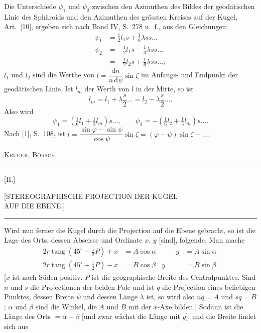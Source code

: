 Die Unterschiede $\psi_1$ und $\psi_2$ zwischen den Azimuthen des Bildes der geodätischen Linie des Sphäroids und den Azimuthen des grössten Kreises auf der Kugel, Art.~[10], ergeben sich nach Band IV, S.~278 u.~f., aus den Gleichungen:
\[
\begin{aligned}
\psi_1&=\tfrac12l_1s+\tfrac16\lambda ss\ldots\\
\psi_2&=-\tfrac12l_1s-\tfrac13\lambda ss\ldots\\
&=-\tfrac12l_2s+\tfrac16\lambda ss\ldots;
\end{aligned}
\]
$l_1$ und $l_2$ sind die Werthe von $l=\dfrac{\mathrm dn}{n\,\mathrm d\psi}\sin\zeta$ im Anfangs- und Endpunkt der geodätischen Linie. Ist $l_m$ der Werth von $l$ in der Mitte, so ist
\[
l_m=l_1+\lambda\frac s2\ldots=l_2-\lambda\frac s2\ldots.
\]
Also wird
\[
\psi_1=(\tfrac16l_1+\tfrac13l_m)s\ldots,\qquad\psi_2=-(\tfrac16l_2+\tfrac13l_m)s\ldots.
\]
Nach [1], S.~108, ist $l=\dfrac{\sin\varphi-\sin\psi}{\cos\psi}\sin\zeta=(\varphi-\psi)\sin\zeta-\ldots.$\par
\noindent\hfill\textsc{Krüger, Börsch.}\par
\par\endgroup
\vfill\begin{center}\rule{.24\textwidth}{.4pt}\end{center}
\clearpage
\begin{center}
[II.]\par\bigskip
{\large [STEREOGRAPHISCHE PROJECTION DER KUGEL\\AUF DIE EBENE.]}\par\bigskip
\rule{.1\textwidth}{.4pt}\par\bigskip
[1.]
\end{center}
Wird nun ferner die Kugel durch die  Projection auf die Ebene gebracht, so ist die Lage des Orts, dessen Abscisse und Ordinate $x$, $y$ [sind], folgende. Man mache
\[
\begin{aligned}
2r\operatorname{tang}(45^\circ-\tfrac12P)+x&=A\cos\alpha&\qquad y&=A\sin\alpha\\
2r\operatorname{tang}(45^\circ+\tfrac12P)-x&=B\cos\beta&y&=B\sin\beta.
\end{aligned}
\]
[$x$ ist nach Süden positiv. $P$ ist die geographische Breite des Centralpunktes. Sind $n$ und $s$ die Projectionen der beiden Pole und ist $q$ die Projection eines beliebigen Punktes, dessen Breite $\psi$ und dessen Länge $\lambda$ ist, so wird also $nq=A$ und $sq=B$; $\alpha$ und $\beta$ sind die Winkel, die $A$ und $B$ mit der $x$-Axe bilden.] Sodann ist die Länge des Orts $=\alpha+\beta$ [und zwar wächst die Länge mit $y$]; und die Breite findet sich aus
